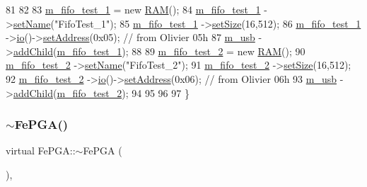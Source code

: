 \begin{DoxyCode}
81   
82 
83   \hyperlink{classFePGA_af911fcb4fc76acd553e9a492174f134b}{m\_fifo\_test\_1}    = \textcolor{keyword}{new} \hyperlink{classRAM}{RAM}();  
84   \hyperlink{classFePGA_af911fcb4fc76acd553e9a492174f134b}{m\_fifo\_test\_1}    ->\hyperlink{classObject_ae30fea75683c2d149b6b6d17c09ecd0c}{setName}(\textcolor{stringliteral}{"FifoTest\_1"});
85   \hyperlink{classFePGA_af911fcb4fc76acd553e9a492174f134b}{m\_fifo\_test\_1}    ->\hyperlink{classRAM_adcf2ebb12f1a3e833ce7d5a33670c29d}{setSize}(16,512);        
86   \hyperlink{classFePGA_af911fcb4fc76acd553e9a492174f134b}{m\_fifo\_test\_1}    ->\hyperlink{classIOobject_af04fb94137c3d86849f478ac5afab5d1}{io}()->\hyperlink{classIOdata_af98cbfbc28346ebb9b64ca0203af1463}{setAddress}(0x05); \textcolor{comment}{// from Olivier 05h}
87   \hyperlink{classFePGA_afb7947e600a66d914ee524acec3d8b1f}{m\_usb}            ->\hyperlink{classHierarchy_ad677774ff38fcb257c04a3a10d471fac}{addChild}(\hyperlink{classFePGA_af911fcb4fc76acd553e9a492174f134b}{m\_fifo\_test\_1});  
88 
89   \hyperlink{classFePGA_ad42013742385c695067b466c933665c9}{m\_fifo\_test\_2}    = \textcolor{keyword}{new} \hyperlink{classRAM}{RAM}();  
90   \hyperlink{classFePGA_ad42013742385c695067b466c933665c9}{m\_fifo\_test\_2}    ->\hyperlink{classObject_ae30fea75683c2d149b6b6d17c09ecd0c}{setName}(\textcolor{stringliteral}{"FifoTest\_2"});
91   \hyperlink{classFePGA_ad42013742385c695067b466c933665c9}{m\_fifo\_test\_2}    ->\hyperlink{classRAM_adcf2ebb12f1a3e833ce7d5a33670c29d}{setSize}(16,512);        
92   \hyperlink{classFePGA_ad42013742385c695067b466c933665c9}{m\_fifo\_test\_2}    ->\hyperlink{classIOobject_af04fb94137c3d86849f478ac5afab5d1}{io}()->\hyperlink{classIOdata_af98cbfbc28346ebb9b64ca0203af1463}{setAddress}(0x06); \textcolor{comment}{// from Olivier 06h}
93   \hyperlink{classFePGA_afb7947e600a66d914ee524acec3d8b1f}{m\_usb}            ->\hyperlink{classHierarchy_ad677774ff38fcb257c04a3a10d471fac}{addChild}(\hyperlink{classFePGA_ad42013742385c695067b466c933665c9}{m\_fifo\_test\_2});  
94   
95 
96 
97 \}
\end{DoxyCode}
\mbox{\label{classFePGA_aa445095a44c521b6b7803feaef6c16ba}} 
\subsubsection{\texorpdfstring{$\sim$\+Fe\+P\+G\+A()}{~FePGA()}}
{\footnotesize\ttfamily virtual Fe\+P\+G\+A\+::$\sim$\+Fe\+P\+GA (\begin{DoxyParamCaption}{ }\end{DoxyParamCaption})\hspace{0.3cm}{\ttfamily [inline]}, {\ttfamily [virtual]}}



